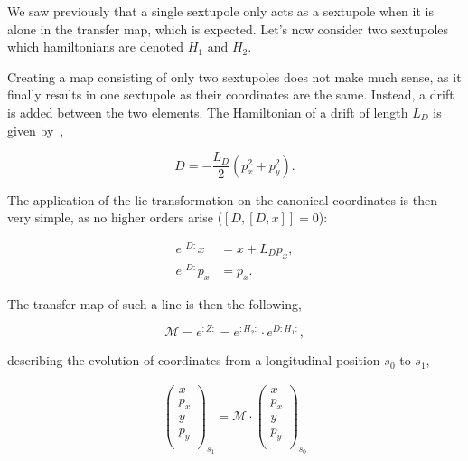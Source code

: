 We saw previously that a single sextupole only acts as a sextupole when it is alone in the transfer
map, which is expected. Let's now consider two sextupoles which hamiltonians are denoted $H_{1}$ and
$H_{2}$.

Creating a map consisting of only two sextupoles does not make much sense, as it finally results in
one sextupole as their coordinates are the same. Instead, a drift is added between the two elements.
The Hamiltonian of a drift of length $L_D$ is given by~\cite{herr_mathematical_2018},

\begin{equation}
    D = -\frac{L_D}{2} (p_x^2 + p_y^2).
\end{equation}

The application of the lie transformation on the canonical coordinates is then very simple, as no
higher orders arise ($[D, [D, x]] = 0$):

\begin{equation}
    \begin{aligned}
        e^{:D:} x   &= x + L_D p_x, \\
        e^{:D:} p_x &= p_x.
    \end{aligned}
\end{equation}

The transfer map of such a line is then the following,

\begin{equation}
    \mathcal{M} = e^{:Z:} = e^{:H_{2}:} \cdot e^{D:H_{1}:},
\end{equation}

describing the evolution of coordinates from a longitudinal position $s_0$ to $s_1$,

\begin{equation}
    \begin{aligned}
        \begin{pmatrix}
            x \\
            p_x \\
            y \\
            p_y \\
        \end{pmatrix}_{s_1}
        =
        \mathcal{M} \cdot
        \begin{pmatrix}
            x \\
            p_x \\
            y \\
            p_y \\
        \end{pmatrix}_{s_0}
    \end{aligned}
    \label{eq:coordinate_systems:transformation_coords_sextupole}
\end{equation}

